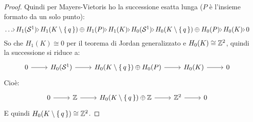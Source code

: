 \begin{proof}
  Quindi per Mayers-Vietoris ho la successione esatta lunga ($ P $ è l'insieme
  formato da un solo punto):
  \[
    \begin{tikzcd}[nodes={column sep=3pt, outer sep = 1pt, inner sep = 1pt}]
      \dots \rar & H_1(\Sph{1}) \rar & H_1(K \setminus \set{q}) \oplus H_1(P) \rar & H_1(K) \rar & H_0(\Sph{1}) \rar & H_0(K \setminus \set{q})
      \oplus H_0(P) \rar & H_0(K) \rar & 0
    \end{tikzcd}
  \]
  So che $ H_1(K) \cong 0 $ per il teorema di Jordan generalizzato e $ H_0(K) \cong \mathbb{Z}^2 $,
  quindi la successione si riduce a:
  \[
    \begin{tikzcd}%
      0 \rar & H_0(\Sph{1}) \rar & H_0(K \setminus \set{q}) \oplus H_0(P) \rar & H_0(K) \rar & 0
    \end{tikzcd}
  \]
  Cioè:
  \[
    \begin{tikzcd}%
      0 \rar & \Z \rar & H_0(K \setminus \set{q}) \oplus \Z \rar & \Z^2 \rar & 0
    \end{tikzcd}
  \]
  E quindi $ H_0(K \setminus \set{q}) \cong \mathbb{Z}^2 $.
\end{proof}

